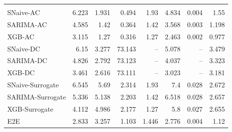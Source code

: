 \begin{longtable}{lrrrrrrr}
\addlinespace[2pt]
\multicolumn{8}{@{}l}{\quad Horizon $H=24$} \\[2pt]
SNaive-AC & 6.223 & 1.931 & 0.494 & 1.93 & 4.834 & 0.004 & 1.55 \\
SARIMA-AC & 4.585 & 1.42 & 0.364 & 1.42 & 3.568 & 0.003 & 1.198 \\
XGB-AC & 3.115 & 1.27 & 0.316 & 1.27 & 2.463 & 0.002 & 0.977 \\
SNaive-DC & 6.15 & 3.277 & 73.143 & -- & 5.078 & -- & 3.479 \\
SARIMA-DC & 4.826 & 2.792 & 73.123 & -- & 4.037 & -- & 3.323 \\
XGB-DC & 3.461 & 2.616 & 73.111 & -- & 3.023 & -- & 3.181 \\
SNaive-Surrogate & 6.545 & 5.69 & 2.314 & 1.93 & 7.4 & 0.028 & 2.672 \\
SARIMA-Surrogate & 5.336 & 5.138 & 2.203 & 1.42 & 6.518 & 0.028 & 2.657 \\
XGB-Surrogate & 4.112 & 4.986 & 2.177 & 1.27 & 5.8 & 0.027 & 2.655 \\
E2E & 2.833 & 3.257 & 1.103 & 1.446 & 2.776 & 0.004 & 1.12 \\
\end{longtable}
\endgroup
